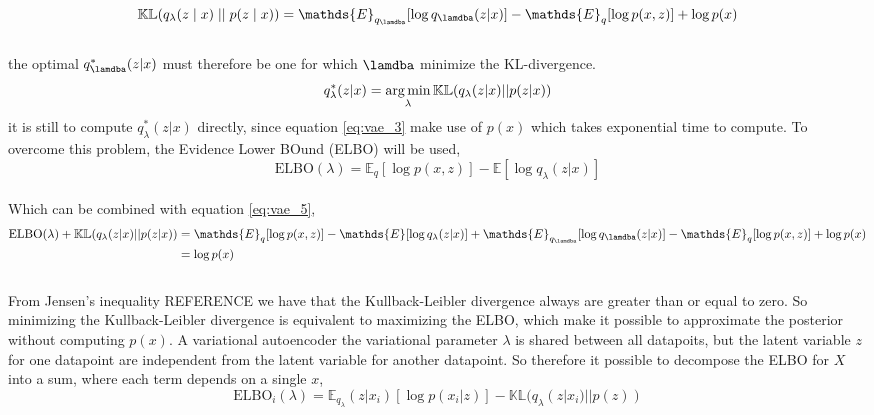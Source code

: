 \documentclass[11pt]{article}
\begin{document}
\\
\begin{equation}\label{eq:vae_3}
    \mathbb{KL}(q_\lambda(z \mid x) \mid \mid p(z \mid x)) = \mathds{E}_{q_{\lamdba}}[\log q_{\lamdba} (z | x)] - \mathds{E}_{q}[\log p(x, z)] + \log p(x)
\end{equation}
\\
the optimal $q_{\lamdba}^{\ast}(z | x)$ must therefore be one for which $\lamdba$ minimize the KL-divergence.
\\
\begin{equation}\label{eq:vae_4}
    q^{\ast}_{\lambda}(z | x) = \operatorname*{arg\,min}_{\lambda} \mathbb{KL}(q_{\lambda} (z | x) || p(z | x))
\end{equation}
it is still to compute $q^{\ast}_{\lambda}(z | x)$ directly, since equation \ref{eq:vae_3} make use of $p(x)$ which takes exponential time to compute. To overcome this problem, the Evidence Lower BOund (ELBO) will be used,
\\
\begin{equation}\label{eq:vae_5}
    \text{ELBO}(\lambda) = \mathds{E}_{q}[\log p(x, z)] - \mathds{E}[\log q_{\lambda} (z | x)]
\end{equation}
\\ 
Which can be combined with equation \ref{eq:vae_5},
\begin{equation}
\begin{split}
    \text{ELBO}(\lambda) + \mathbb{KL}(q_{\lambda} (z | x) || p(z | x)) &= \mathds{E}_{q}[\log p(x, z)] - \mathds{E}[\log q_{\lambda} (z | x)] + \mathds{E}_{q_{\lamdba}}[\log q_{\lamdba} (z | x)] - \mathds{E}_{q}[\log p(x, z)] + \log p(x) \\
    &= \log p(x)
\end{split}
\end{equation}
\\
From Jensen's inequality REFERENCE we have that the Kullback-Leibler divergence always are greater than or equal to zero. So minimizing the Kullback-Leibler divergence is equivalent to maximizing the ELBO, which make it possible to approximate the posterior without computing $p(x)$. A variational autoencoder the variational parameter $\lambda$ is shared between all datapoits, but the latent variable $z$ for one datapoint are independent from the latent variable for another datapoint. So therefore it possible to decompose the ELBO for $X$ into a sum, where each term depends on a single $x$,
\begin{equation}\label{eq:vae_6}
    \text{ELBO}_{i}(\lambda) = \mathds{E}_{q_{\lambda}}(z | x_{i}) [\log p(x_{i} | z)] - \mathbb{KL}(q_{\lambda} (z | x_{i}) || p(z))
\end{equation}
\end{document}
